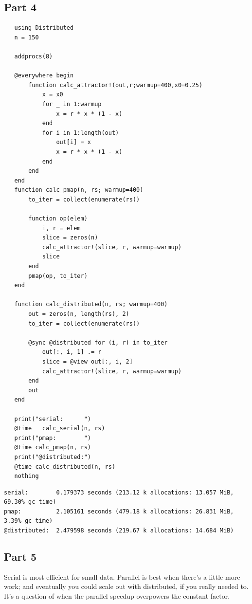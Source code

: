 \documentclass[nobib]{tufte-handout}
\begin{document}
\subsection{Part 4}
\label{sec:orge4a9969}
\begin{verbatim}
   using Distributed
   n = 150

   addprocs(8)

   @everywhere begin
       function calc_attractor!(out,r;warmup=400,x0=0.25)
           x = x0
           for _ in 1:warmup
               x = r * x * (1 - x)
           end
           for i in 1:length(out)
               out[i] = x
               x = r * x * (1 - x)
           end
       end
   end
   function calc_pmap(n, rs; warmup=400)
       to_iter = collect(enumerate(rs))

       function op(elem)
           i, r = elem
           slice = zeros(n)
           calc_attractor!(slice, r, warmup=warmup)
           slice
       end
       pmap(op, to_iter)
   end

   function calc_distributed(n, rs; warmup=400)
       out = zeros(n, length(rs), 2)
       to_iter = collect(enumerate(rs))

       @sync @distributed for (i, r) in to_iter
           out[:, i, 1] .= r
           slice = @view out[:, i, 2]
           calc_attractor!(slice, r, warmup=warmup)
       end
       out
   end

   print("serial:      ")
   @time   calc_serial(n, rs)
   print("pmap:        ")
   @time calc_pmap(n, rs)
   print("@distributed:")
   @time calc_distributed(n, rs)
   nothing
\end{verbatim}

\begin{verbatim}
serial:        0.179373 seconds (213.12 k allocations: 13.057 MiB, 69.30% gc time)
pmap:          2.105161 seconds (479.18 k allocations: 26.831 MiB, 3.39% gc time)
@distributed:  2.479598 seconds (219.67 k allocations: 14.684 MiB)
\end{verbatim}

\subsection{Part 5}
\label{sec:orgdad3180}
Serial is most efficient for small data. Parallel is best when there's a little more work; and eventually you could scale out with distributed, if you really needed to. It's a question of when the parallel speedup overpowers the constant factor.
\end{document}
